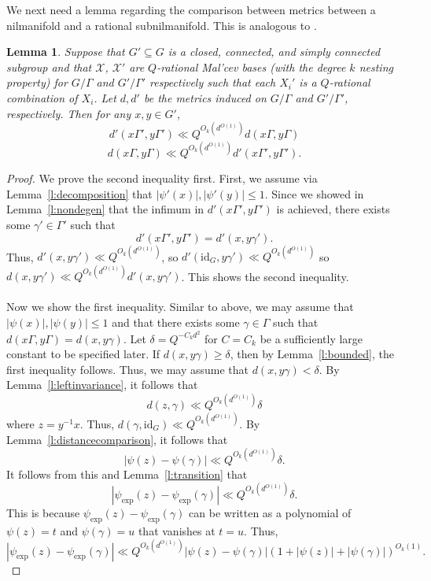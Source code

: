 \documentclass[11pt, a4paper]{amsart}
\theoremstyle{plain}
\theoremstyle{plain}
\newtheorem{lemma}{Lemma}
\theoremstyle{definition}
\theoremstyle{remark}
\numberwithin{equation}{section}
\numberwithin{lemma}{section}
\numberwithin{proposition}{section}
\numberwithin{corollary}{section}
\numberwithin{definition}{section}
\numberwithin{claim}{section}
\begin{document}
We next need a lemma regarding the comparison between metrics between a nilmanifold and a rational subnilmanifold. This is analogous to \cite[Lemma A.17]{GT12}.
\begin{lemma}
Suppose that $G' \subseteq G$ is a closed, connected, and simply connected subgroup and that $\mathcal{X}$, $\mathcal{X}'$ are $Q$-rational Mal'cev bases (with the degree $k$ nesting property) for $G/\Gamma$ and $G'/\Gamma'$ respectively such that each $X_i'$ is a $Q$-rational combination of $X_i$. Let $d, d'$ be the metrics induced on $G/\Gamma$ and $G'/\Gamma'$, respectively. Then for any $x, y \in G'$,
$$d'(x\Gamma', y\Gamma') \ll Q^{O_k(d^{O(1)})} d(x\Gamma, y\Gamma)$$
$$d(x\Gamma, y\Gamma) \ll Q^{O_k(d^{O(1)})} d'(x\Gamma', y\Gamma').$$
\end{lemma}
\begin{proof}
We prove the second inequality first. First, we assume via Lemma~\ref{l:decomposition} that $|\psi'(x)|, |\psi'(y)| \le 1$. Since we showed in Lemma~\ref{l:nondegen} that the infimum in $d'(x\Gamma', y\Gamma')$ is achieved, there exists some $\gamma' \in \Gamma'$ such that
$$d'(x\Gamma', y\Gamma') = d'(x, y\gamma').$$
Thus, $d'(x, y\gamma') \ll Q^{O_k(d^{O(1)})}$, so $d'(\mathrm{id}_G, y\gamma') \ll Q^{O_k(d^{O(1)})}$ so $d(x, y\gamma') \ll Q^{O_k(d^{O(1)})}d'(x, y\gamma')$. This shows the second inequality. \\\\
Now we show the first inequality. Similar to above, we may assume that $|\psi(x)|, |\psi(y)| \le 1$ and that there exists some $\gamma \in \Gamma$ such that $d(x\Gamma, y\Gamma) = d(x, y\gamma)$. Let $\delta = Q^{-C_kd^2}$ for $C = C_k$ be a sufficiently large constant to be specified later. If $d(x, y\gamma) \ge \delta$, then by Lemma~\ref{l:bounded}, the first inequality follows. Thus, we may assume that $d(x, y\gamma) < \delta$. By Lemma~\ref{l:leftinvariance}, it follows that
$$d(z, \gamma) \ll Q^{O_k(d^{O(1)})}\delta$$
where $z = y^{-1}x$. Thus, $d(\gamma, \mathrm{id}_G) \ll Q^{O_k(d^{O(1)})}$. By Lemma~\ref{l:distancecomparison}, it follows that
$$|\psi(z) - \psi(\gamma)| \ll Q^{O_k(d^{O(1)})}\delta.$$
It follows from this and Lemma~\ref{l:transition} that
$$|\psi_{\exp}(z) - \psi_{\exp}(\gamma)| \ll Q^{O_k(d^{O(1)})}\delta.$$
This is because $\psi_{\exp}(z) - \psi_{\exp}(\gamma)$ can be written as a polynomial of $\psi(z) = t$ and $\psi(\gamma) = u$ that vanishes at $t = u$. Thus,
$$|\psi_{\exp}(z) - \psi_{\exp}(\gamma)| \ll Q^{O_k(d^{O(1)})} |\psi(z) - \psi(\gamma)| (1 + |\psi(z)| + |\psi(\gamma)|)^{O_k(1)}.$$

\end{proof}
\end{document}
